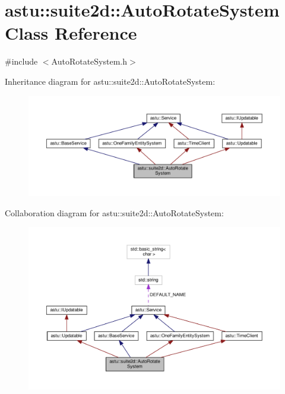 \hypertarget{classastu_1_1suite2d_1_1AutoRotateSystem}{}\section{astu\+:\+:suite2d\+:\+:Auto\+Rotate\+System Class Reference}
\label{classastu_1_1suite2d_1_1AutoRotateSystem}


{\ttfamily \#include $<$Auto\+Rotate\+System.\+h$>$}



Inheritance diagram for astu\+:\+:suite2d\+:\+:Auto\+Rotate\+System\+:\nopagebreak
\begin{figure}[H]
\begin{center}
\leavevmode
\includegraphics[width=350pt]{classastu_1_1suite2d_1_1AutoRotateSystem__inherit__graph}
\end{center}
\end{figure}


Collaboration diagram for astu\+:\+:suite2d\+:\+:Auto\+Rotate\+System\+:\nopagebreak
\begin{figure}[H]
\begin{center}
\leavevmode
\includegraphics[width=350pt]{classastu_1_1suite2d_1_1AutoRotateSystem__coll__graph}
\end{center}
\end{figure}
